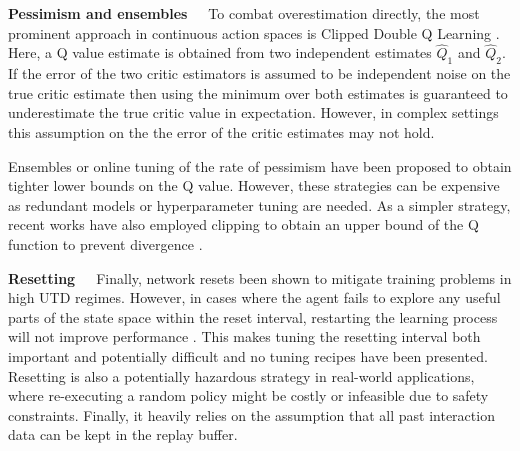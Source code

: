 \textbf{Pessimism and ensembles}~~~To combat overestimation directly, the most prominent approach in continuous action spaces is Clipped Double Q Learning \parencite{fujimoto2018addressing}. 
Here, a Q value estimate is obtained from two independent estimates $\hat{Q}_1$ and $\hat{Q}_2$.
If the error of the two critic estimators is assumed to be independent noise on the true critic estimate 
then using the minimum over both estimates is guaranteed to underestimate the true critic value in expectation.
However, in complex settings this assumption on the the error of the critic estimates may not hold. 

Ensembles \parencite{lan2020maxmin,chen2020randomized,hiraoka2022dropout,farebrother2023protovalue} or online tuning of the rate of pessimism \parencite{moskovitz2021tactical} have been proposed to obtain tighter lower bounds on the Q value.
However, these strategies can be expensive as redundant models or hyperparameter tuning are needed.
As a simpler strategy, recent works have also employed clipping to obtain an upper bound of the Q function to prevent divergence \parencite{fujimoto2024sale}.

\textbf{Resetting}~~~Finally, network resets been shown to mitigate training problems \parencite{nikishin2022primacy,doro2023barrier,schwarzer2023bigger,nauman2024bigger} in high UTD regimes.
However, in cases where the agent fails to explore any useful parts of the state space within the reset interval, restarting the learning process will not improve performance \parencite{hussing2024dissecting}.
This makes tuning the resetting interval both important and potentially difficult and no tuning recipes have been presented.
Resetting is also a potentially hazardous strategy in real-world applications, where re-executing a random policy might be costly or infeasible due to safety constraints.
Finally, it heavily relies on the assumption that all past interaction data can be kept in the replay buffer.




